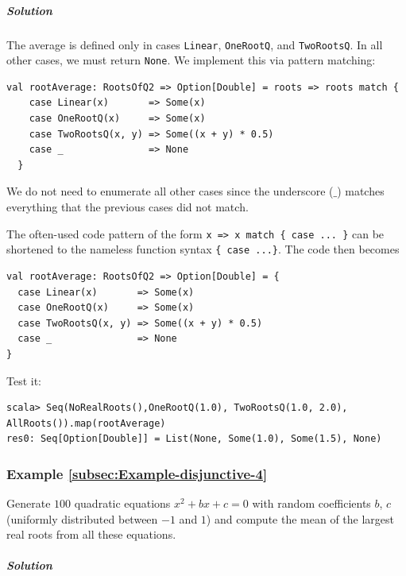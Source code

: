 \subparagraph{Solution}

The average is defined only in cases \lstinline!Linear!, \lstinline!OneRootQ!,
and \lstinline!TwoRootsQ!. In all other cases, we must return \lstinline!None!.
We implement this via pattern matching:
\begin{lstlisting}
val rootAverage: RootsOfQ2 => Option[Double] = roots => roots match {
    case Linear(x)       => Some(x)
    case OneRootQ(x)     => Some(x)
    case TwoRootsQ(x, y) => Some((x + y) * 0.5)
    case _               => None
  }
\end{lstlisting}
We do not need to enumerate all other cases since the underscore ($\_$)
matches everything that the previous cases did not match.

The often-used code pattern of the form \lstinline!x => x match { case ... }!
can be shortened to the nameless function syntax \lstinline!{ case ...}!.
The code then becomes
\begin{lstlisting}
val rootAverage: RootsOfQ2 => Option[Double] = {
  case Linear(x)       => Some(x)
  case OneRootQ(x)     => Some(x)
  case TwoRootsQ(x, y) => Some((x + y) * 0.5)
  case _               => None
}
\end{lstlisting}
Test it:
\begin{lstlisting}
scala> Seq(NoRealRoots(),OneRootQ(1.0), TwoRootsQ(1.0, 2.0), AllRoots()).map(rootAverage)
res0: Seq[Option[Double]] = List(None, Some(1.0), Some(1.5), None)
\end{lstlisting}


\subsubsection{Example \label{subsec:Example-disjunctive-4}\ref{subsec:Example-disjunctive-4}}

Generate $100$ quadratic equations $x^{2}+bx+c=0$ with random coefficients
$b$, $c$ (uniformly distributed between $-1$ and $1$) and compute
the mean of the largest real roots from all these equations.

\subparagraph{Solution}

